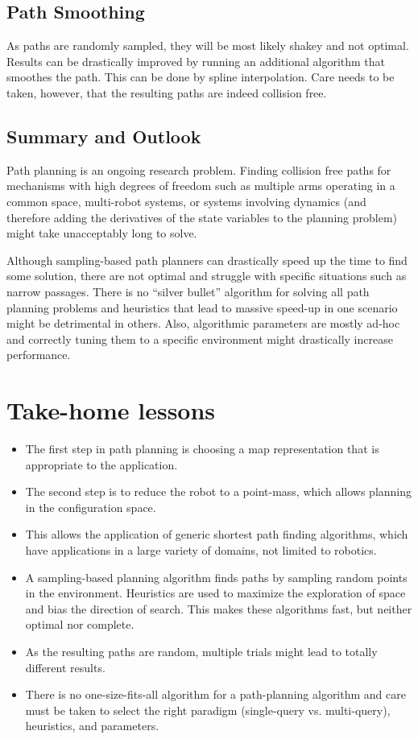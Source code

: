 \subsection{Path Smoothing}
As paths are randomly sampled, they will be most likely shakey and not optimal. Results can be drastically improved by running an additional algorithm that smoothes the path. This can be done by spline interpolation. Care needs to be taken, however, that the resulting paths are indeed collision free.

\subsection{Summary and Outlook}
Path planning is an ongoing research problem. Finding collision free paths for mechanisms with high degrees of freedom such as multiple arms operating in a common space, multi-robot systems, or systems involving dynamics (and therefore adding the derivatives of the state variables to the planning problem) might take unacceptably long to solve.

Although sampling-based path planners can drastically speed up the time to find some solution, there are not optimal and struggle with specific situations such as narrow passages. There is no ``silver bullet'' algorithm for solving all path planning problems and heuristics that lead to massive speed-up in one scenario might be detrimental in others. Also, algorithmic parameters are mostly ad-hoc and correctly tuning them to a specific environment might drastically increase performance.
 

\section*{Take-home lessons}
\begin{itemize}
\item The first step in path planning is choosing a map representation that is appropriate to the application.
\item The second step is to reduce the robot to a point-mass, which allows planning in the configuration space.
\item This allows the application of generic shortest path finding algorithms, which have applications in a large variety of domains, not limited to robotics.
\item A sampling-based planning algorithm finds paths by sampling random points in the environment. Heuristics are used to maximize the exploration of space and bias the direction of search. This makes these algorithms fast, but neither optimal nor complete.
\item As the resulting paths are random, multiple trials might lead to totally different results.
\item There is no one-size-fits-all algorithm for a path-planning algorithm and care must be taken to select the right paradigm (single-query vs. multi-query), heuristics, and parameters.
\end{itemize}

